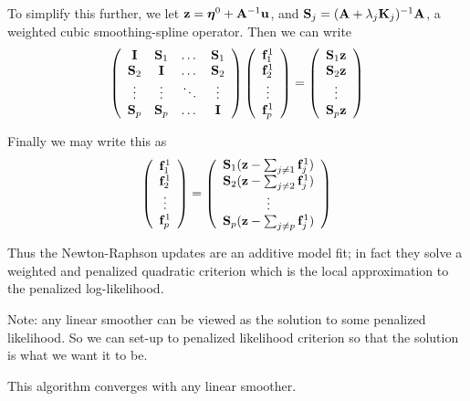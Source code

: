 To simplify this further, we let ${\mathbf z} = \mbox{\boldmath $\eta$\unboldmath}^0 + \mathbf{A}^{-1}
\mathbf{u}$, and ${\mathbf S}_j = (\mathbf{A} + \lambda_j \mathbf{K}_j)^{-1}
\mathbf{A}$, a weighted cubic smoothing-spline operator. Then we can
write
\[
\left(
\begin{array}{cccc}
\mathbf{I}&\mathbf{S}_1&\dots&\mathbf{S}_1\\
\mathbf{S}_2&\mathbf{I}&\dots&\mathbf{S}_2\\
\vdots&\vdots&\ddots&\vdots\\
\mathbf{S}_p&\mathbf{S}_p&\dots&\mathbf{I}
\end{array}
\right)
\left(
\begin{array}{c}
{\mathbf f}_1^1\\
{\mathbf f}_2^1\\
\vdots\\
{\mathbf f}_p^1
\end{array}
\right)
=
\left(
\begin{array}{c}
\mathbf{S}_1 \mathbf{z}\\
\mathbf{S}_2 \mathbf{z}\\
\vdots\\
\mathbf{S}_p \mathbf{z}
\end{array}
\right)
\]

Finally we may write this as
\[
\left(
\begin{array}{c}
\mathbf{f}_1^1\\
\mathbf{f}_2^1\\
\vdots\\
\mathbf{f}_p^1
\end{array}
\right)
=
\left(
\begin{array}{cccc}
\mathbf{S}_1({\mathbf z} - \sum_{j\neq 1} {\mathbf f}^1_j)\\
\mathbf{S}_2({\mathbf z} - \sum_{j\neq 2} {\mathbf f}^1_j)\\
\vdots\\
\mathbf{S}_p({\mathbf z} - \sum_{j\neq p} {\mathbf f}^1_j)\\
\end{array}
\right)
\]

Thus the Newton-Raphson updates are an additive model fit; in fact
they solve a weighted and penalized quadratic criterion which is the
local approximation to the penalized log-likelihood. 

Note: any linear smoother can be viewed as the solution to
some penalized likelihood. So we can set-up to penalized likelihood
criterion so that the solution is what we want it to be.

This algorithm converges with any linear smoother.


